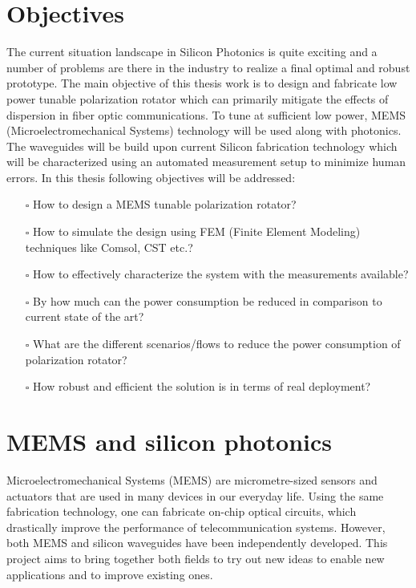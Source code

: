\documentclass[../main.tex]{subfiles}
\begin{document}
	\section{Objectives}
The current situation landscape in Silicon Photonics is quite exciting and a number of problems are there in the industry to realize a final optimal and robust prototype. The main objective of this thesis work is to design and fabricate low power tunable polarization rotator which can primarily mitigate the effects of dispersion in fiber optic communications. To tune at sufficient low power, MEMS (Microelectromechanical Systems) technology will be used along with photonics. The waveguides will be build upon current Silicon fabrication technology which will be characterized using an automated measurement setup to minimize human errors. In this thesis following objectives will be addressed:
\begin{itemize}
	\item[$\square$] How to design a MEMS tunable polarization rotator?
	\item[$\square$]  How to simulate the design using FEM (Finite Element Modeling) techniques like Comsol, CST etc.?
	\item[$\square$]  How to effectively characterize the system with the measurements available?
	\item[$\square$]  By how much can the power consumption be reduced in comparison to current state of the art?
	\item[$\square$]  What are the different scenarios/flows to reduce the power consumption of polarization rotator?
	\item[$\square$]  How robust and efficient the solution is in terms of real deployment?
\end{itemize}

	\section{MEMS and silicon photonics}
Microelectromechanical Systems (MEMS) are micrometre-sized sensors and actuators that are used in many devices in our everyday life. Using the same fabrication technology, one can fabricate on-chip optical circuits, which drastically improve the performance of telecommunication systems. However, both MEMS and silicon waveguides have been independently developed. This project aims to bring together both fields to try out new ideas to enable new applications and to improve existing ones. 
	
\end{document}
